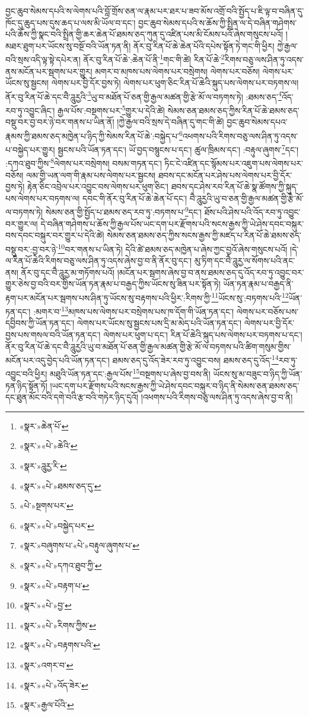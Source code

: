 བྱང་ཆུབ་སེམས་དཔའི་ས་ལེགས་པའི་བློ་གྲོས་ཅན་ལ་རྣམ་པར་ཐར་པ་ཟབ་མོས་འགྲོ་བའི་སྤྱོད་པ་ཇི་ལྟ་བ་བཞིན་དུ་ཁོང་དུ་ཆུད་པས་དུས་ཆད་པ་ལས་མི་ཡོལ་བ་དང་། བྱང་ཆུབ་སེམས་དཔའི་ས་ཆོས་ཀྱི་སྤྲིན་ལ་དེ་བཞིན་གཤེགས་པའི་ཆོས་ཀྱི་སྣང་བའི་སྤྲིན་གྱི་ཆར་ཆེན་པོ་ཐམས་ཅད་ཀུན་དུ་འཛིན་པས་མི་ངོམས་པའོ་ཞེས་གསུངས་པའོ། །མཐར་ཐུག་པར་ཡོངས་སུ་བསྔོ་བའི་ཡོན་ཏན་ནི། ནོར་བུ་རིན་པོ་ཆེ་ཆེན་པོའི་དཔེས་སྟོན་ཏེ་གང་གི་ཕྱིར། ཀྱེ་རྒྱལ་བའི་སྲས་འདི་ལྟ་སྟེ་དཔེར་ན། ནོར་བུ་རིན་པོ་ཆེ་:ཆེན་པོ་ནི་\footnote{«སྣར་»ཆེན་པོ་}གང་གི་ཚེ། རིན་པོ་ཆེ་\footnote{«སྣར་»«པེ་»ཆེའི་}རིགས་བཅུ་ལས་ཤིན་ཏུ་འདས་ནས་མངོན་པར་སྦགས་པར་གྱུར། མགར་བ་མཁས་པས་ལེགས་པར་བསྲེགས། ལེགས་པར་བཅོས། ལེགས་པར་ཡོངས་སུ་སྦྱངས། ལེགས་པར་བྱི་དོར་བྱས་ཏེ། ལེགས་པར་ཕུག་ཅིང་རིན་པོ་ཆེའི་སྐུད་པས་ལེགས་པར་བཏགས་ལ། ནོར་བུ་རིན་པོ་ཆེ་དང་བཻ་ཌཱུརྱའི་\footnote{«སྣར་»ཌཱུརྱ་རི་}ཡུ་བ་མཐོན་པོ་ཅན་གྱི་རྒྱལ་མཚན་གྱི་རྩེ་མོ་ལ་བཏགས་ཏེ། :ཐམས་ཅད་\footnote{«སྣར་»«པེ་»ཐམས་ཅད་དུ་}འོད་རབ་ཏུ་འབྱུང་ཞིང་། རྒྱལ་པོས་:བསྔགས་པར་\footnote{«པེ་»སྔགས་པར་}གྱུར་པ་དེའི་ཚེ། སེམས་ཅན་ཐམས་ཅད་ཀྱིས་རིན་པོ་ཆེ་ཐམས་ཅད་བསྡུ་བར་བྱ་བར་ཉེ་བར་གནས་པ་ཡིན་ནོ། །ཀྱེ་རྒྱལ་བའི་སྲས་དེ་བཞིན་དུ་གང་གི་ཚེ། བྱང་ཆུབ་སེམས་དཔའ་རྣམས་ཀྱི་ཐམས་ཅད་མཁྱེན་པ་ཉིད་ཀྱི་སེམས་རིན་པོ་ཆེ་:བསྐྱེད་པ་\footnote{«སྣར་»«པེ་»བསྐྱེད་པར་}འཕགས་པའི་རིགས་བཅུ་ལས་ཤིན་ཏུ་འདས་པ་བསྐྱེད་པར་གྱུར། སྦྱངས་པའི་ཡོན་ཏན་དང་། ཡོ་བྱད་བསྙུངས་པ་དང་། ཚུལ་ཁྲིམས་དང་། :བརྟུལ་ཞུགས་\footnote{«སྣར་»བཞུགས་པ་«པེ་»བརྟུལ་ཞུགས་པ་}དང་། :དཀའ་ཐུབ་ཀྱིས་\footnote{«སྣར་»«པེ་»དཀའ་ཐུབ་ཀྱི་}ལེགས་པར་བསྲེགས། བསམ་གཏན་དང་། ཏིང་ངེ་འཛིན་དང་སྙོམས་པར་འཇུག་པས་ལེགས་པར་བཅོས། ལམ་གྱི་ཡན་ལག་གི་རྣམ་པས་ལེགས་པར་སྦྱངས། ཐབས་དང་མངོན་པར་ཤེས་པས་ལེགས་པར་བྱི་དོར་བྱས་ཏེ། རྟེན་ཅིང་འབྲེལ་པར་འབྱུང་བས་ལེགས་པར་ཕུག་ཅིང་། ཐབས་དང་ཤེས་རབ་རིན་པོ་ཆེ་སྣ་ཚོགས་ཀྱི་སྐུད་པས་ལེགས་པར་བཏགས་ལ། དབང་གི་ནོར་བུ་རིན་པོ་ཆེ་ཆེན་པོ་དང་། བཻ་ཌཱུརྱའི་ཡུ་བ་ཅན་གྱི་རྒྱལ་མཚན་གྱི་རྩེ་མོ་ལ་བཏགས་ཏེ། སེམས་ཅན་གྱི་སྤྱོད་པ་ཐམས་ཅད་རབ་ཏུ་:བཏགས་པ་\footnote{«སྣར་»«པེ་»བརྟག་པ་}དང་། ཐོས་པའི་ཤེས་པའི་འོད་རབ་ཏུ་འབྱུང་བར་གྱུར་ལ། དེ་བཞིན་གཤེགས་པ་ཆོས་ཀྱི་རྒྱལ་པོས་ཡང་དག་པར་རྫོགས་པའི་སངས་རྒྱས་ཀྱི་ཡེ་ཤེས་དབང་བསྐུར་བས་དབང་བསྐུར་བར་གྱུར་པ་དེའི་ཚེ། སེམས་ཅན་ཐམས་ཅད་ཀྱིས་སངས་རྒྱས་ཀྱི་མཛད་པ་རིན་པོ་ཆེ་ཐམས་ཅད་བསྡུ་བར་:བྱ་བར་ཉེ་\footnote{«སྣར་»«པེ་»བྱ་}བར་གནས་པ་ཡིན་ཏེ། དེའི་ཚེ་ཐམས་ཅད་མཁྱེན་པ་ཞེས་ཀྱང་བྱའོ་ཞེས་གསུངས་པའོ། །དེ་ལ་རིན་པོ་ཆེའི་རིགས་བཅུ་ལས་ཤིན་ཏུ་འདས་ཞེས་བྱ་བ་ནི་ནོར་བུ་དང་། མུ་ཏིག་དང་བཻ་ཌཱུརྱ་ལ་སོགས་པའི་ནང་ནས། ནོར་བུ་དང་བཻ་ཌཱུརྱ་མ་གཏོགས་པའོ། །མངོན་པར་སྦགས་ཞེས་བྱ་བ་ནས་ཐམས་ཅད་དུ་འོད་རབ་ཏུ་འབྱུང་བར་གྱུར་ཅེས་བྱ་བའི་བར་གྱིས་ཡོན་ཏན་རྣམ་པ་བརྒྱད་ཀྱིས་ཡོངས་སུ་ཟིན་པར་སྟོན་ཏེ། ཡོན་ཏན་རྣམ་པ་བརྒྱད་ནི་རྟག་པར་མངོན་པར་སྦགས་པས་ཤིན་ཏུ་ཡོངས་སུ་བརྟགས་པའི་ཕྱིར་:རིགས་ཀྱི་\footnote{«སྣར་»«པེ་»རིགས་ཀྱིས་}ཡོངས་སུ་:བཏགས་པའི་\footnote{«སྣར་»«པེ་»བརྟགས་པའི་}ཡོན་ཏན་དང་། :མགར་བ་\footnote{«སྣར་»འགར་བ་}མཁས་པས་ལེགས་པར་བསྲེགས་པས་ཁ་དོག་གི་ཡོན་ཏན་དང་། ལེགས་པར་བཅོས་པས་དབྱིབས་ཀྱི་ཡོན་ཏན་དང་། ལེགས་པར་ཡོངས་སུ་སྦྱངས་པས་དྲི་མ་མེད་པའི་ཡོན་ཏན་དང་། ལེགས་པར་བྱི་དོར་བྱས་པས་གསལ་བའི་ཡོན་ཏན་དང་། ལེགས་པར་ཕུག་པ་དང་། རིན་པོ་ཆེའི་སྐུད་པས་ལེགས་པར་བཏགས་པ་དང་། ནོར་བུ་རིན་པོ་ཆེ་དང་བཻ་ཌཱུརྱའི་ཡུ་བ་མཐོན་པོ་ཅན་གྱི་རྒྱལ་མཚན་གྱི་རྩེ་མོ་ལ་བཏགས་པའི་ཚིག་གསུམ་གྱིས་མངོན་པར་འདུ་བྱེད་པའི་ཡོན་ཏན་དང་། ཐམས་ཅད་དུ་འོད་ཟེར་རབ་ཏུ་འབྱུང་བས། ཐམས་ཅད་དུ་འོད་\footnote{«སྣར་»«པེ་»འོད་ཟེར་}རབ་ཏུ་འབྱུང་བའི་ཕྱིར། མཐུའི་ཡོན་ཏན་དང་:རྒྱལ་པོས་\footnote{«སྣར་»རྒྱལ་པོའི་}བསྔགས་པ་ཞེས་བྱ་བས་ནི། ཡོངས་སུ་མ་བཟུང་བ་ཉིད་ཀྱི་ཡོན་ཏན་ཉིད་སྟོན་ཏོ། །ཡང་དག་པར་རྫོགས་པའི་སངས་རྒྱས་ཀྱི་ཡེ་ཤེས་དབང་བསྐུར་བ་ཉིད་ནི་སེམས་ཅན་ཐམས་ཅད་དང་ཐུན་མོང་བའི་དགེ་བའི་རྩ་བའི་གཏེར་ཉིད་དུའོ། །འཕགས་པའི་རིགས་བཅུ་ལས་ཤིན་ཏུ་འདས་ཞེས་བྱ་བ་ནི། 
